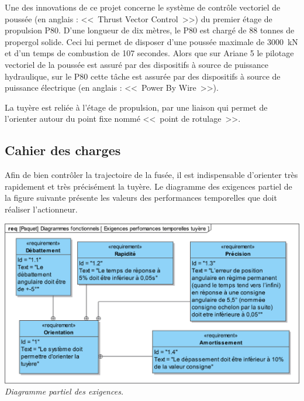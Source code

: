 \documentclass[10pt,fleqn]{article} %
\begin{document}
\begin{multicols}{2}
Une des innovations de ce projet concerne le système de contrôle vectoriel de poussée (en anglais : <<~Thrust Vector Control~>>) du premier étage de propulsion P80. D'une longueur de dix mètres, le P80 est chargé de 88 tonnes de propergol solide. Ceci lui permet de disposer d'une poussée maximale de \SI{3 000}{kN} et d'un temps de combustion de 107 secondes. Alors que sur Ariane 5 le pilotage vectoriel de la poussée est assuré par des dispositifs à source de puissance hydraulique, sur le P80 cette tâche est assurée par des dispositifs à source de puissance électrique (en anglais : <<~Power By Wire~>>).

La tuyère est reliée à l'étage de propulsion, par une liaison qui permet de l'orienter autour du point fixe nommé <<~point de rotulage~>>. 


\subsection*{Cahier des charges\\}

Afin de bien contrôler la trajectoire de la fusée, il est indispensable d'orienter très rapidement et très précisément la tuyère. Le diagramme des exigences partiel de la figure suivante %
présente les valeurs des performances temporelles que doit réaliser l'actionneur.

\begin{center}
\includegraphics[width=.95\linewidth]{images/fig_02}
\textit{Diagramme partiel des exigences.}
\end{center}


\end{multicols}
\end{document}
